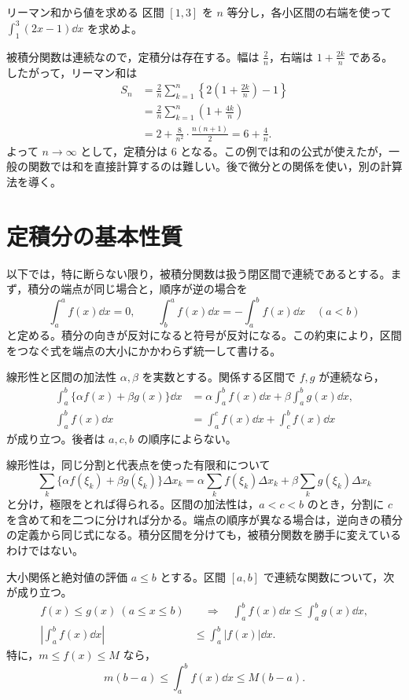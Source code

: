 \begin{example}{リーマン和から値を求める}
区間 $[1,3]$ を $n$ 等分し，各小区間の右端を使って $\int_1^3(2x-1)\dd x$ を求めよ。
\end{example}
被積分関数は連続なので，定積分は存在する。幅は $\frac2n$，右端は $1+\frac{2k}{n}$ である。したがって，リーマン和は
\begin{align*}
 S_n
 &=\frac2n\sum_{k=1}^{n}\left\{2\left(1+\frac{2k}n\right)-1\right\}\\
 &=\frac2n\sum_{k=1}^{n}\left(1+\frac{4k}n\right)\\
 &=2+\frac8{n^2}\cdot\frac{n(n+1)}2
  =6+\frac4n.
\end{align*}
よって $n\to\infty$ として，定積分は $6$ となる。この例では和の公式が使えたが，一般の関数では和を直接計算するのは難しい。後で微分との関係を使い，別の計算法を導く。

\section{定積分の基本性質}\label{節:定積分性質}
以下では，特に断らない限り，被積分関数は扱う閉区間で連続であるとする。まず，積分の端点が同じ場合と，順序が逆の場合を
\[
 \int_a^a f(x)\dd x=0,\qquad
 \int_b^a f(x)\dd x=-\int_a^b f(x)\dd x\quad(a<b)
\]
と定める。積分の向きが反対になると符号が反対になる。この約束により，区間をつなぐ式を端点の大小にかかわらず統一して書ける。

\begin{theorem}{線形性と区間の加法性}\label{定理:積分基本性質}
$\alpha,\beta$ を実数とする。関係する区間で $f,g$ が連続なら，
\begin{align*}
 \int_a^b\{\alpha f(x)+\beta g(x)\}\dd x
 &=\alpha\int_a^b f(x)\dd x+\beta\int_a^b g(x)\dd x,\\
 \int_a^b f(x)\dd x
 &=\int_a^c f(x)\dd x+\int_c^b f(x)\dd x
\end{align*}
が成り立つ。後者は $a,c,b$ の順序によらない。
\end{theorem}

線形性は，同じ分割と代表点を使った有限和について
\[
 \sum_k\{\alpha f(\xi_k)+\beta g(\xi_k)\}\Delta x_k
 =\alpha\sum_k f(\xi_k)\Delta x_k
  +\beta\sum_k g(\xi_k)\Delta x_k
\]
と分け，極限をとれば得られる。区間の加法性は，$a<c<b$ のとき，分割に $c$ を含めて和を二つに分ければ分かる。端点の順序が異なる場合は，逆向きの積分の定義から同じ式になる。積分区間を分けても，被積分関数を勝手に変えているわけではない。

\begin{theorem}{大小関係と絶対値の評価}\label{定理:積分評価}
$a\le b$ とする。区間 $[a,b]$ で連続な関数について，次が成り立つ。
\begin{align*}
 f(x)\le g(x)\ (a\le x\le b)
 &\quad\Longrightarrow\quad
 \int_a^b f(x)\dd x\le\int_a^b g(x)\dd x,\\
 \left|\int_a^b f(x)\dd x\right|
 &\le\int_a^b|f(x)|\dd x.
\end{align*}
特に，$m\le f(x)\le M$ なら，
\[
 m(b-a)\le\int_a^b f(x)\dd x\le M(b-a).
\]
\end{theorem}

